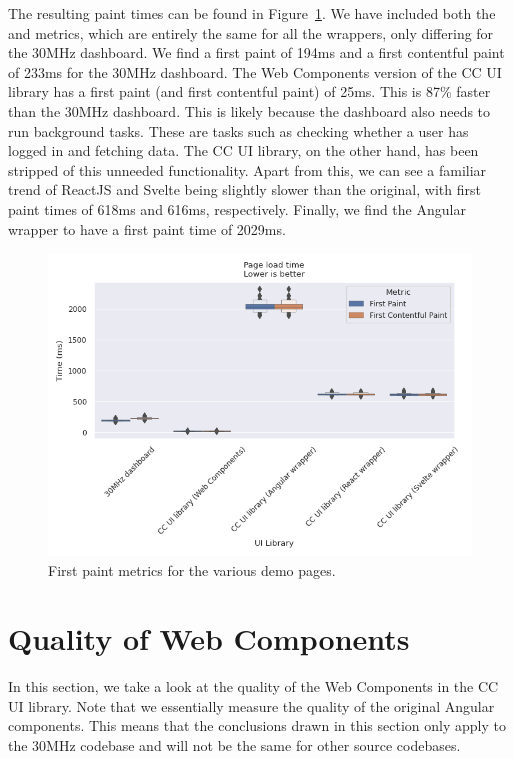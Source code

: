 The resulting paint times can be found in Figure~\ref{fig:results:first-paint}. We have included both the  and  metrics, which are entirely the same for all the wrappers, only differing for the 30MHz dashboard. We find a first paint of 194ms and a first contentful paint of 233ms for the 30MHz dashboard. The Web Components version of the CC UI library has a first paint (and first contentful paint) of 25ms. This is 87\% faster than the 30MHz dashboard. This is likely because the dashboard also needs to run background tasks. These are tasks such as checking whether a user has logged in and fetching data. The CC UI library, on the other hand, has been stripped of this unneeded functionality. Apart from this, we can see a familiar trend of ReactJS and Svelte being slightly slower than the original, with first paint times of 618ms and 616ms, respectively. Finally, we find the Angular wrapper to have a first paint time of 2029ms.

\begin{figure}[h]
  \includegraphics[width=\columnwidth]{plots/first-contentful-paint.png}
  \caption{First paint metrics for the various demo pages.}
  \label{fig:results:first-paint}
  \centering
\end{figure}

\section{Quality of Web Components}
In this section, we take a look at the quality of the Web Components in the CC UI library. Note that we essentially measure the quality of the original Angular components. This means that the conclusions drawn in this section only apply to the 30MHz codebase and will not be the same for other source codebases.

